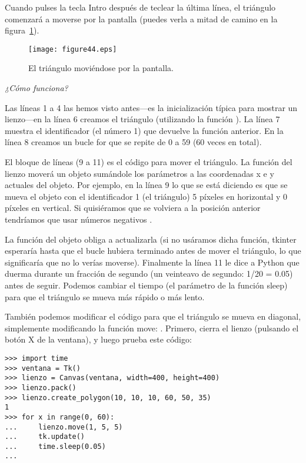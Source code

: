 Cuando pulses la tecla Intro después de teclear la última línea, el triángulo comenzará a moverse por la pantalla (puedes verla a mitad de camino en la figura~\ref{fig44}).

\begin{figure}
\begin{center}
\texttt{[image: figure44.eps]}
\end{center}
\caption{El triángulo moviéndose por la pantalla.}\label{fig44}
\end{figure}

\par
\emph{¿Cómo funciona?}
\par
Las líneas 1 a 4 las hemos visto antes---es la inicialización típica para mostrar un lienzo---en la línea 6 creamos el triángulo (utilizando la función ). La línea 7 muestra el identificador (el número 1) que devuelve la función anterior. En la línea 8 creamos un bucle for que se repite de 0 a 59 (60 veces en total).

El bloque de líneas (9 a 11) es el código para mover el triángulo. La función  del lienzo moverá un objeto sumándole los parámetros a las coordenadas x e y actuales del objeto.  Por ejemplo, en la línea 9 lo que se está diciendo es que se mueva el objeto con el identificador 1 (el triángulo) 5 píxeles en horizontal y 0 píxeles en vertical.  Si quisiéramos que se volviera a la posición anterior tendríamos que usar números negativos .
 
La función  del objeto  obliga a actualizarla (si no usáramos dicha función, tkinter esperaría hasta que el bucle hubiera terminado antes de mover el triángulo, lo que significaría que no lo verías moverse). Finalmente la línea 11 le dice a Python que duerma durante un fracción de segundo (un veinteavo de segundo: 1/20 = 0.05) antes de seguir. Podemos cambiar el tiempo (el parámetro de la función sleep) para que el triángulo se mueva más rápido o más lento.

También podemos modificar el código para que el triángulo se mueva en diagonal, simplemente modificando la función move: .  Primero, cierra el lienzo (pulsando el botón X de la ventana), y luego prueba este código:

\begin{listingignore}
\begin{verbatim}
>>> import time
>>> ventana = Tk()
>>> lienzo = Canvas(ventana, width=400, height=400)
>>> lienzo.pack()
>>> lienzo.create_polygon(10, 10, 10, 60, 50, 35)
1
>>> for x in range(0, 60):
...     lienzo.move(1, 5, 5)
...     tk.update()
...     time.sleep(0.05)
...
\end{verbatim}
\end{listingignore}

